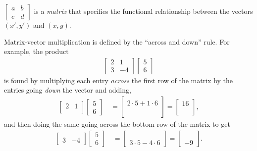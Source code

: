 \documentclass[letter]{article}
\begin{document}
\vspace{3mm}
$\begin{bmatrix} a & b \\ c & d \end{bmatrix}$ is a {\em matrix} that specifies
the functional relationship between the vectors $(x',y')$ and $(x,y)$.

\vspace{3mm}
Matrix-vector multiplication is defined by the ``across and down'' rule. For example,
the product 
\begin{align*}
  \begin{bmatrix} 2 & 1 \\ 3 & -4 \end{bmatrix}                       
  \begin{bmatrix} 5 \\ 6 \end{bmatrix} 
\end{align*}
is found by multiplying each entry {\em across} the first row of the matrix by the entries
going {\em down} the vector and adding,
\begin{align*}
  \begin{bmatrix} 2 & 1 \\  & \end{bmatrix}
  \begin{bmatrix} 5 \\ 6 \end{bmatrix}  \quad
  =
  \begin{bmatrix} 2 \cdot 5 + 1 \cdot 6 \\ \phantom{5} \end{bmatrix} 
  = 
  \begin{bmatrix} 16 \\  \phantom{5} \end{bmatrix},
\end{align*}
and then doing the same going across the bottom row of the matrix to get
\begin{align*}
  \begin{bmatrix}  \\  3 & -4 \end{bmatrix}
  \begin{bmatrix} 5 \\ 6 \end{bmatrix} \quad
  =
  \begin{bmatrix} \phantom{5} \\ 3 \cdot 5 - 4 \cdot 6 \end{bmatrix} 
  = 
  \begin{bmatrix} \phantom{16} \\  -9 \end{bmatrix}.
\end{align*}
\end{document}
